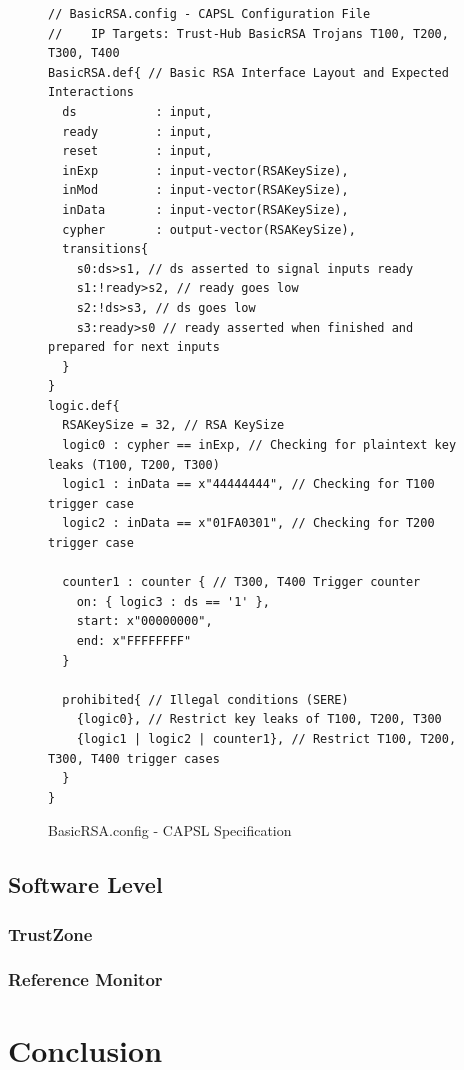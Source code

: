 \documentclass[sigconf]{acmart}
\theoremstyle{plain}
\theoremstyle{remark}
\begin{document}
\begin{figure} [t]
\begin{lstlisting}
// BasicRSA.config - CAPSL Configuration File
//    IP Targets: Trust-Hub BasicRSA Trojans T100, T200, T300, T400
BasicRSA.def{ // Basic RSA Interface Layout and Expected Interactions
  ds           : input,
  ready        : input,
  reset        : input,
  inExp        : input-vector(RSAKeySize),
  inMod        : input-vector(RSAKeySize),
  inData       : input-vector(RSAKeySize),
  cypher       : output-vector(RSAKeySize),
  transitions{
    s0:ds>s1, // ds asserted to signal inputs ready
    s1:!ready>s2, // ready goes low
    s2:!ds>s3, // ds goes low
    s3:ready>s0 // ready asserted when finished and prepared for next inputs
  }
}
logic.def{
  RSAKeySize = 32, // RSA KeySize
  logic0 : cypher == inExp, // Checking for plaintext key leaks (T100, T200, T300)
  logic1 : inData == x"44444444", // Checking for T100 trigger case
  logic2 : inData == x"01FA0301", // Checking for T200 trigger case

  counter1 : counter { // T300, T400 Trigger counter
    on: { logic3 : ds == '1' },
    start: x"00000000",
    end: x"FFFFFFFF"
  }

  prohibited{ // Illegal conditions (SERE)
    {logic0}, // Restrict key leaks of T100, T200, T300
    {logic1 | logic2 | counter1}, // Restrict T100, T200, T300, T400 trigger cases
  }
}
\end{lstlisting}
\vspace*{-0.2cm}
\caption{BasicRSA.config - CAPSL Specification}
\label{fig:BasicRSASpec}
\vspace*{-0.3cm}
\end{figure}


\subsection{Software Level}

\subsubsection{TrustZone}

\subsubsection{Reference Monitor}


\section{Conclusion} \label{sec:conclusion}




\end{document}
